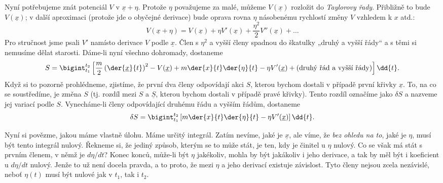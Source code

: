     Nyní potřebujeme znát potenciál \(V\) v \(\underline{x}+\eta\). Protože \(\eta\) považujeme za
    malé, můžeme \(V(\underline{x})\) rozložit do \emph{Taylorovy řady}. Přibližně to bude
    \(V(\underline{x})\); v další aproximaci (protože jde o obyčejné derivace) bude oprava rovna
    \(\eta\) násobenému rychlostí změny \(V\) vzhledem k \(x\) atd.:
    \begin{equation*}
      V(\underline{x}+\eta) = V(\underline{x}) + \eta V'(\underline{x})
      + \dfrac{\eta^2}{2} V''(\underline{x}) + \ldots
    \end{equation*}
    Pro stručnost jsme psali \(V'\) namísto derivace \(V\) podle \(\underline{x}\). Člen s
    \(\eta^2\) a vyšší členy spadnou do škatulky „druhý a vyšší řády“ a s těmi si nemusíme dělat
    starosti. Dáme-li nyní všechno dohromady, dostaneme
    \begin{equation*}
      S = \bigint_{t_1}^{t_2}
        \left[
            \frac{m}{2}\left(\der{\underline{x}}{t}\right)^2-V(\underline{x}) 
            + m\der{x}{t}\der{\eta}{t} - \eta V'(\underline{x}) 
            + (\text{druhý řád a vyšší řády})
        \right]\dd{t}.
    \end{equation*}
    Když si to pozorně prohlédneme, zjistíme, že první dva členy odpovídají akci \(S\), kterou
    bychom dostali v případě první křivky \(\underline{x}\). To, na co se soustředíme, je změna
    \(S\) (tj. rozdíl mezi \(S\) a \(\underline{S}\), kterou bychom dostali v případě pravé křivky).
    Tento rozdíl označíme jako \(\delta S\) a nazveme jej variací podle \(S\). Vynecháme-li členy
    odpovídající druhému řádu a vyšším řádům, dostaneme
    \begin{equation*}
      \delta S  = \bigint_{t_1}^{t_2}
                    \left[m\der{x}{t}\der{\eta}{t} - \eta V'(\underline{x})\right]\dd{t}.
    \end{equation*}  
    
    Nyní si povězme, jakou máme vlastně úlohu. Máme určitý integrál. Zatím nevíme, jaké je
    \(\underline{x}\), ale víme, že \emph{bez ohledu na to}, jaké je \(\eta\), musí být tento
    integrál nulový. Řekneme si, že jediný způsob, kterým se to může stát, je ten, kdy je činitel u
    \(\eta\) nulový. Co se však má stát s prvním členem, v němž je \(d\eta/dt\)? Konec konců,
    může-li být \(\eta\) jakékoliv, mohla by být jakákoliv i jeho derivace, a tak by měl být i
    koeficient u \(d\eta/dt\) nulový. Jenže to už není docela pravda, a to proto, že mezi \(\eta\) a
    jeho derivací existuje závislost. Tyto členy nejsou zcela nezávislé, neboť \(\eta(t)\) musí být
    nulové jak v \(t_1\), tak i \(t_2\).

